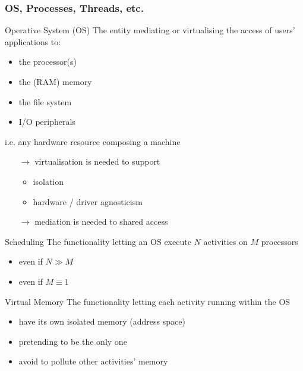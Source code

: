 \documentclass[presentation]{beamer}\mode<presentation>{\usetheme{AMSBolognaFC}}
\begin{document}
\begin{frame}[allowframebreaks]
    \frametitle{OS, Processes, Threads, etc.}

    \begin{block}{Operative System (OS)}
        The entity mediating or virtualising the access of users' applications to:
        \begin{itemize}
            \item the processor(s)
            \item the (RAM) memory
            \item the file system
            \item I/O peripherals
        \end{itemize}
        i.e. any hardware resource composing a machine
        \begin{itemize}
            \item[$\rightarrow$] virtualisation is needed to support
            \begin{itemize}
                \item isolation
                \item hardware / driver agnosticism
            \end{itemize}
            \item[$\rightarrow$] mediation is needed to shared access
        \end{itemize}
    \end{block}

    \begin{block}{Scheduling}
        The functionality letting an OS execute $N$ activities on $M$ processors
        \begin{itemize}
            \item even if $N \gg M$
            \item even if $M \equiv 1$
        \end{itemize}
    \end{block}

    \begin{block}{Virtual Memory}
        The functionality letting each activity running within the OS
        \begin{itemize}
            \item have its own isolated memory (address space)
            \item pretending to be the only one
            \item avoid to pollute other activities' memory
        \end{itemize}
    \end{block}


\end{frame}
\end{document}
